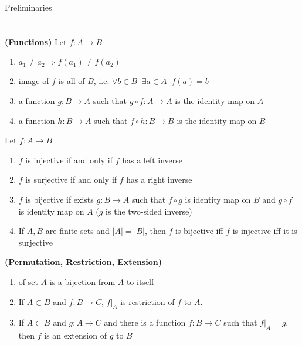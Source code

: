 \documentclass[11pt]{article}
\begin{document}
\begin{center}
    {\Huge Preliminaries}
\end{center}

\tableofcontents
\newpage


\section{}


\begin{definition*}
\textbf{(Functions)} Let $f:A\to B$
\begin{enumerate}
    \item {} $a_1\neq a_2 \Rightarrow f(a_1) \neq f(a_2)$
    \item {} image of $f$ is all of $B$, i.e. $\forall b\in B \;\; \exists a\in A \;\; f(a)=b$
    \item {} a function $g:B\to A$ such that $g\circ f:A\to A$ is the identity map on $A$
    \item {} a function $h:B\to A$ such that $f\circ h:B\to B$ is the identity map on $B$
\end{enumerate}
\end{definition*} 
    
\begin{proposition*} Let $f:A\to B$
\begin{enumerate}
    \item $f$ is injective if and only if $f$ has a left inverse
    \item $f$ is surjective if and only if $f$ has a right inverse
    \item $f$ is bijective if exists $g:B\to A$ such that $f\circ g$ is identity map on $B$ and $g\circ f$ is identity map on $A$ ($g$ is the two-sided inverse)
    \item If $A,B$ are finite sets and $|A|=|B|$, then $f$ is bijective iff $f$ is injective iff it is surjective
\end{enumerate}
\end{proposition*}
  
\begin{definition*}
    \textbf{(Permutation, Restriction, Extension)}
    \begin{enumerate}
        \item {} of set $A$ is a bijection from $A$ to itself
        \item {} If $A\subset B$ and $f:B\to C$, $f|_{A}$ is restriction of $f$ to $A$.
        \item {} If $ A\subset B$ and $g:A\to C$ and there is a function $f:B\to C$ such that $f|_{A}=g$, then $f$ is an extension of $g$ to $B$
    \end{enumerate}
\end{definition*}
\end{document}
